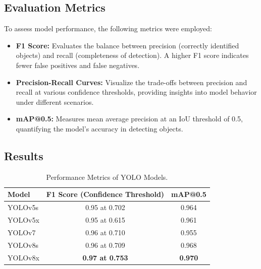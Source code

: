 \documentclass[letterpaper,11pt]{report}
\begin{document}
\subsection{Evaluation Metrics}
To assess model performance, the following metrics were employed:
\begin{itemize}
    \item \textbf{F1 Score:} Evaluates the balance between precision (correctly identified objects) and recall (completeness of detection). A higher F1 score indicates fewer false positives and false negatives.
    \item \textbf{Precision-Recall Curves:} Visualize the trade-offs between precision and recall at various confidence thresholds, providing insights into model behavior under different scenarios.
    \item \textbf{mAP@0.5:} Measures mean average precision at an IoU threshold of 0.5, quantifying the model's accuracy in detecting objects.
\end{itemize}

\newpage
\subsection{Results}

\begin{table}[h!]
\centering
\begin{tabular}{|l|c|c|}
\hline
\textbf{Model} & \textbf{F1 Score (Confidence Threshold)} & \textbf{mAP@0.5} \\
\hline
YOLOv5s & 0.95 at 0.702 & 0.964 \\
YOLOv5x & 0.95 at 0.615 & 0.961 \\
YOLOv7  & 0.96 at 0.710 & 0.955 \\
YOLOv8s & 0.96 at 0.709 & 0.968 \\
YOLOv8x & \textbf{0.97 at 0.753} & \textbf{0.970} \\
\hline
\end{tabular}
\caption{Performance Metrics of YOLO Models.}
\label{tab:object-detection-results}
\end{table}
\end{document}
